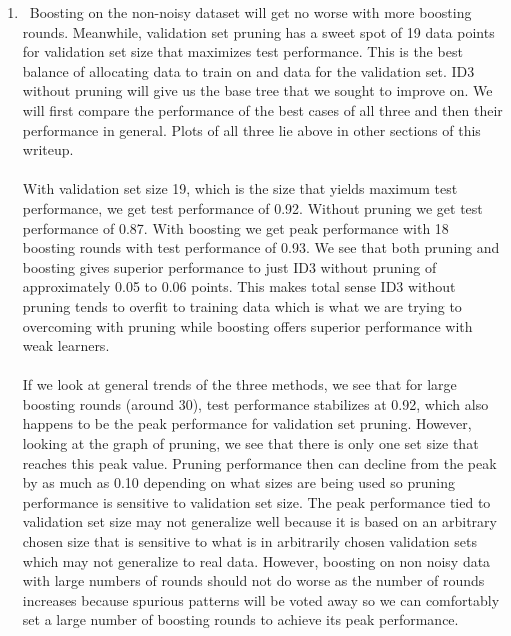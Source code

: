 \documentclass[12pt,letterpaper]{article}
\begin{document}
\begin{enumerate}
\begin{enumerate}
{\begin{enumerate}
\item \ Boosting on the non-noisy dataset will get no worse with more boosting rounds. Meanwhile, validation set pruning has a sweet spot of 19 data points for validation set size that maximizes test performance. This is the best balance of allocating data to train on and data for the validation set. ID3 without pruning will give us the base tree that we sought to improve on. We will first compare the performance of the best cases of all three and then their performance in general. Plots of all three lie above in other sections of this writeup. \\ \\
         With validation set size 19, which is the size that yields maximum test performance, we get test performance of 0.92. Without pruning we get test performance of 0.87. With boosting we get peak performance with 18 boosting rounds with test performance of 0.93. We see that both pruning and boosting gives superior performance to just ID3 without pruning of approximately 0.05 to 0.06 points. This makes total sense ID3 without pruning tends to overfit to training data which is what we are trying to overcoming with pruning while boosting offers superior performance with weak learners. \\ \\
        If we look at general trends of the three methods, we see that for large boosting rounds (around 30), test performance stabilizes at 0.92, which also happens to be the peak performance for validation set pruning. However, looking at the graph of pruning, we see that there is only one set size that reaches this peak value. Pruning performance then can decline from the peak by as much as 0.10 depending on what sizes are being used so pruning performance is sensitive to validation set size. The peak performance tied to validation set size may not generalize well because it is based on an arbitrary chosen size that is sensitive to what is in arbitrarily chosen validation sets which may not generalize to real data. However, boosting on non noisy data with large numbers of rounds should not do worse as the number of rounds increases because spurious patterns will be voted away so we can comfortably set a large number of boosting rounds to achieve its peak performance. \\


\end{enumerate}}
\end{enumerate}
\end{enumerate}
\end{document}
